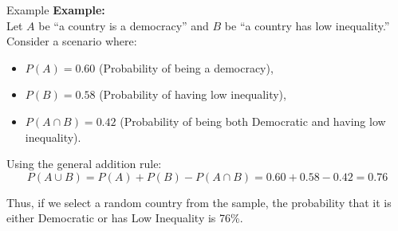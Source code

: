 \documentclass[handout]{beamer} %
\begin{document}
\begin{frame}{Example}
    \textbf{Example:}\\[0.5ex]
    Let \(A\) be “a country is a democracy” and \(B\) be “a country has low inequality.” Consider a scenario where:
    \begin{itemize}
        \item \(P(A) = 0.60\) (Probability of being a democracy),\pause
        \item \(P(B) = 0.58\) (Probability of having low inequality),\pause
        \item \(P(A \cap B) = 0.42\) (Probability of being both Democratic and having low inequality).\pause
    \end{itemize}

    Using the general addition rule:
    \[
    P(A \cup B) = P(A) + P(B) - P(A \cap B) = 0.60 + 0.58 - 0.42 = 0.76
    \]

    Thus, if we select a random country from the sample, the probability that it is either Democratic or has Low Inequality is 76\%.
\end{frame}
\end{document}
